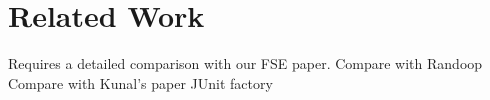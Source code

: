 \section{Related Work}
\label{sec:related}

Requires a detailed comparison with our FSE paper.
Compare with Randoop
Compare with Kunal's paper
JUnit factory
